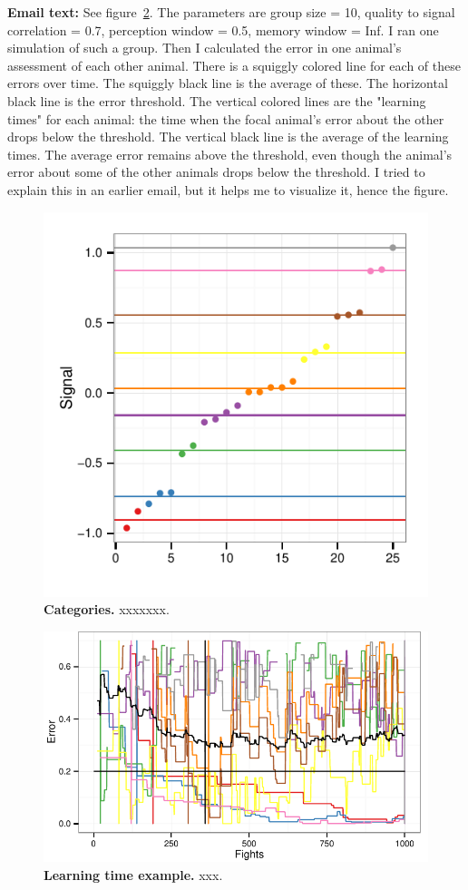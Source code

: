 \textbf{Email text: } See figure~\ref{learnT.ex}. The parameters are group size = 10, quality to signal correlation = 0.7, perception window = 0.5, memory window = Inf. I ran one simulation of such a group. Then I calculated the error in one animal's assessment of each other animal. There is a squiggly colored line for each of these errors over time. The squiggly black line is the average of these. The horizontal black line is the error threshold. The vertical colored lines are the "learning times" for each animal: the time when the focal animal's error about the other drops below the threshold. The vertical black line is the average of the learning times. The average error remains above the threshold, even though the animal's error about some of the other animals drops below the threshold. I tried to explain this in an earlier email, but it helps me to visualize it, hence the figure.


\begin{figure}[h]
\caption{\sffamily\small\textbf{Categories.}
     xxxxxxx.}
\label{cats_ex}
\includegraphics[width=.8\textwidth]{figures/categories.pdf}
\end{figure}

\begin{figure}[h]
\caption{\sffamily\small\textbf{Learning time example.}
     xxx.}
\label{learnT.ex}
\includegraphics[width=.8\textwidth]{figures/learning_time_example.pdf}
\end{figure}

